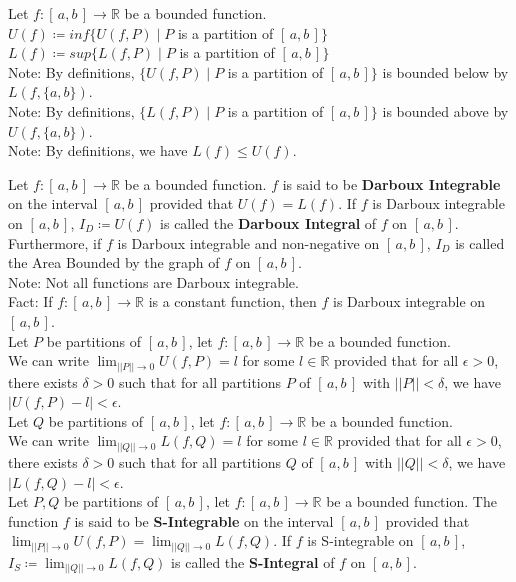 \documentclass[11pt]{article}
\newcommand{\R}{\mathbb{R}}
\newcommand{\note}{\color{gray}Note: \color{black}}
\newcommand{\fact}{\color{gray}Fact: \color{black}}
\newcommand{\Intab}{[\,a,b\,]}
\begin{document}
		\noindent Let $f:[\,a,b\,]\to \R$ be a bounded function.\\ $U(f) \coloneqq inf\{U(f,P) \mid P$ is a partition of $\Intab \}$\\ $L(f) \coloneqq sup\{L(f,P) \mid P$ is a partition of $\Intab \}$\\ 
		\note By definitions, $\{U(f,P) \mid P$ is a partition of $\Intab \}$ is bounded below by $L(f,\{a,b\})$.\\
		\note By definitions, $\{L(f,P) \mid P$ is a partition of $\Intab \}$ is bounded above by $U(f,\{a,b\})$.\\
		\note By definitions, we have $L(f) \leq U(f)$.
		
\clearpage
	
	
		\noindent Let $f:[\,a,b\,]\to \R$ be a bounded function. $f$ is said to be \textbf{Darboux Integrable} on the interval $\Intab$ provided that \mbox{$U(f)=L(f)$}. If $f$ is Darboux integrable on $\Intab$, $I_D \coloneqq U(f)$ is called the \textbf{Darboux Integral} of $f$ on $\Intab$. Furthermore, if $f$ is Darboux integrable and non-negative on $\Intab$, $I_D$ is called the Area Bounded by the graph of $f$ on $\Intab$.\\
		\note Not all functions are Darboux integrable.\\
		\fact If $f:[\,a,b\,]\to \R$ is a constant function, then $f$ is Darboux integrable on $\Intab$.\\
	
		\noindent Let $P$ be partitions of $[\,a,b\,]$, let $f:[\,a,b\,]\to \R$ be a bounded function.\\ We can write \mbox{$\lim_{||P|| \to 0} U(f,P) = l$} for some $l \in \R$ provided that for all $\epsilon>0$, there exists $\delta >0$ such that for all partitions $P$ of $\Intab$ with $||P||<\delta$, we have $|U(f,P)-l|<\epsilon$.\\
		
		\noindent Let $Q$ be partitions of $[\,a,b\,]$, let $f:[\,a,b\,]\to \R$ be a bounded function. \\ We can write \mbox{$\lim_{||Q|| \to 0} L(f,Q) = l$} for some $l \in \R$ provided that for all $\epsilon>0$, there exists $\delta >0$ such that for all partitions $Q$ of $\Intab$ with $||Q||<\delta$, we have $|L(f,Q)-l|<\epsilon$.\\
				
		
		\noindent Let $P,Q$ be partitions of $[\,a,b\,]$, let $f:[\,a,b\,]\to \R$ be a bounded function. The function $f$ is said to be \textbf{S-Integrable} on the interval $\Intab$ provided that \mbox{$\lim_{||P|| \to 0} U(f,P) = \lim_{||Q|| \to 0} L(f,Q)$}. If $f$ is S-integrable on $\Intab$, $I_S \coloneqq \lim_{||Q|| \to 0} L(f,Q)$ is called the \textbf{S-Integral} of $f$ on $\Intab$.\\
		
\end{document}
